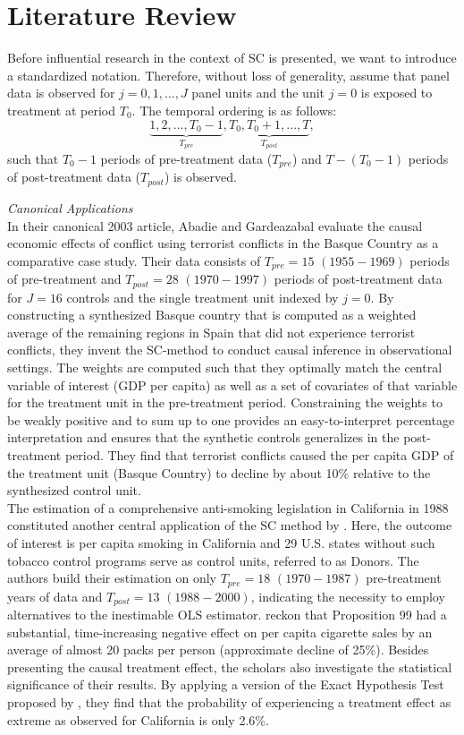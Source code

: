 \section{Literature Review}
\label{Chap2}
Before influential research in the context of \ac{SC} is presented, we want to introduce a standardized notation. Therefore, without loss of generality, assume that panel data is observed for $j = 0,1,...,J$ panel units and the unit $j = 0$ is exposed to treatment at period $T_0$. The temporal ordering is as follows:
$$
\underbrace{1,2,..., T_0 -1}_{T_{pre}},  \underbrace{T_0, T_0 +1, ..., T}_{T_{post}},
$$
such that $T_0 -1$ periods of pre-treatment data ($T_{pre}$) and $T-(T_0 -1)$ periods of post-treatment data ($T_{post}$) is observed.

\textit{Canonical Applications}\\
In their canonical 2003 article, Abadie and Gardeazabal evaluate the causal economic effects of conflict using terrorist conflicts in the Basque Country as a comparative case study. Their data consists of $T_{pre} = 15$ $(1955-1969)$ periods of pre-treatment and $T_{post} = 28$  $(1970-1997)$ periods of post-treatment data for $J = 16$ controls and the single treatment unit indexed by $j = 0$. By constructing a synthesized Basque country that is computed as a weighted average of  the remaining regions in Spain that did not experience terrorist conflicts, they invent the \ac{SC}-method to conduct causal inference in observational settings. The weights are computed such that they optimally match the central variable of interest (\ac{GDP} per capita) as well as a set of covariates of that variable for the treatment unit in the pre-treatment period. Constraining the weights to be weakly positive and to sum up to one provides an easy-to-interpret percentage interpretation and ensures that the synthetic controls generalizes in the post-treatment period. They find that terrorist conflicts caused the per capita \ac{GDP} of the treatment unit (Basque Country) to decline by about 10\% relative to the synthesized control unit. \\
The estimation of a comprehensive anti-smoking legislation in California in 1988 constituted another central application of the \ac{SC} method by \cite{abadie:2010}. Here, the outcome of interest is per capita smoking in California and 29 U.S. states without such tobacco control programs serve as control units, referred to as Donors. The authors build their estimation on only $T_{pre} = 18$ $(1970-1987)$ pre-treatment years of data and $T_{post} = 13$ $(1988-2000)$, indicating the necessity to employ alternatives to the inestimable \ac{OLS} estimator. \cite{abadie:2010} reckon that Proposition 99 had a substantial, time-increasing negative effect on per capita cigarette sales by an average of almost 20 packs per person (approximate decline of 25\%). Besides presenting the causal treatment effect, the scholars also investigate the statistical significance of their results. By applying a version of the Exact Hypothesis Test proposed by \cite{fisher:1971}, they find that the probability of experiencing a treatment effect as extreme as observed for California is only 2.6\%.\\
